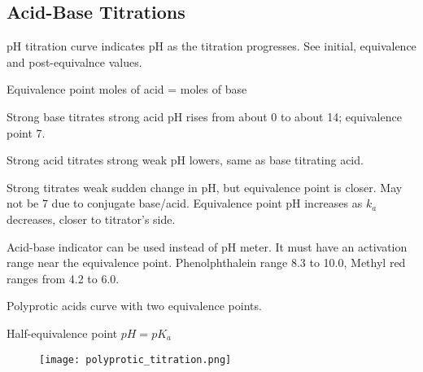 \begin{mdframed}
\begin{multicols}{2}
\subsection{Acid-Base Titrations}
\begin{compactdesc}
    \item[pH titration curve] indicates pH as the titration progresses.
        See initial, equivalence and post-equivalnce values.
    \item[Equivalence point] moles of acid = moles of base
    \item[Strong base titrates strong acid] pH rises from about 0 to about
        14; equivalence point 7.
    \item[Strong acid titrates strong weak] pH lowers, same as base titrating
        acid.
    \item[Strong titrates weak] sudden change in pH, but equivalence point is
        closer. May not be 7 due to conjugate base/acid. Equivalence point pH increases
        as $k_a$ decreases, closer to titrator's side.
    \item[Acid-base indicator] can be used instead of pH meter. It must have
        an activation range near the equivalence point.
        Phenolphthalein range 8.3 to 10.0, Methyl red ranges from 4.2 to 6.0.
    \item[Polyprotic acids] curve with two equivalence points.
    \item[Half-equivalence point] $pH = pK_a$
\end{compactdesc}

\begin{figure}[H]
    \centering
    \texttt{[image: polyprotic\_titration.png]}
\end{figure}
\end{multicols}
\end{mdframed}






